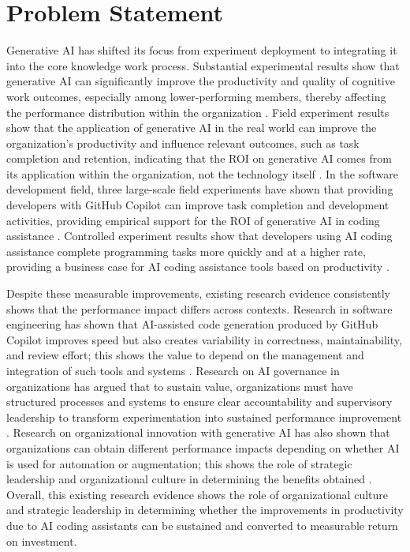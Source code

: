 \documentclass[11pt]{report}
\begin{document}
\chapter*{Problem Statement}

Generative AI has shifted its focus from experiment deployment to integrating it into the core knowledge work process. Substantial experimental results show that generative AI can significantly improve the productivity and quality of cognitive work outcomes, especially among lower-performing members, thereby affecting the performance distribution within the organization \autocite{Noy2023}. Field experiment results show that the application of generative AI in the real world can improve the organization's productivity and influence relevant outcomes, such as task completion and retention, indicating that the ROI on generative AI comes from its application within the organization, not the technology itself \autocite{Brynjolfsson2025}. In the software development field, three large-scale field experiments have shown that providing developers with GitHub Copilot can improve task completion and development activities, providing empirical support for the ROI of generative AI in coding assistance \autocite{Cui2026}. Controlled experiment results show that developers using AI coding assistance complete programming tasks more quickly and at a higher rate, providing a business case for AI coding assistance tools based on productivity \autocite{Peng2023}.

Despite these measurable improvements, existing research evidence consistently shows that the performance impact differs across contexts. Research in software engineering has shown that AI-assisted code generation produced by GitHub Copilot improves speed but also creates variability in correctness, maintainability, and review effort; this shows the value to depend on the management and integration of such tools and systems \autocite{MoradiDakhel2023}. Research on AI governance in organizations has argued that to sustain value, organizations must have structured processes and systems to ensure clear accountability and supervisory leadership to transform experimentation into sustained performance improvement \autocite{Maentymaeki2022}. Research on organizational innovation with generative AI has also shown that organizations can obtain different performance impacts depending on whether AI is used for automation or augmentation; this shows the role of strategic leadership and organizational culture in determining the benefits obtained \autocite{Holmstroem2025}. Overall, this existing research evidence shows the role of organizational culture and strategic leadership in determining whether the improvements in productivity due to AI coding assistants can be sustained and converted to measurable return on investment.
\end{document}
